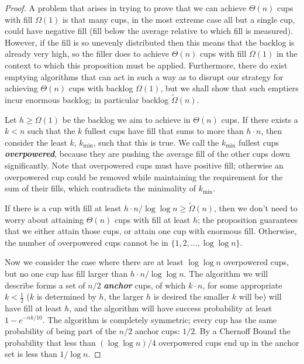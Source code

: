 \documentclass{article}[11pt]
\newcommand{\defn}[1]{{\textit{\textbf{\boldmath #1}}}}
\begin{document}
\begin{proof}
  A problem that arises in trying to prove that we can achieve $\Theta(n)$ cups
  with fill $\Omega(1)$ is that many cups, in the most extreme case all but a
  single cup, could have negative fill (fill below the average relative to
  which fill is measured). However, if the fill is so unevenly distributed then
  this means that the backlog is already very high, so the filler does to
  achieve $\Theta(n)$ cups with fill $\Omega(1)$ in the context to which this
  proposition must be applied. Furthermore, there do exist emptying algorithms
  that can act in such a way as to disrupt our strategy for achieving
  $\Theta(n)$ cups with backlog $\Omega(1)$, but we shall show that such emptiers 
  incur enormous backlog; in particular backlog $\tilde{\Omega}(n)$.

  Let $h \ge \Omega(1)$ be the backlog we aim to achieve in $\Theta(n)$ cups.
  If there exists a $k<n$ such that the $k$ fullest cups have fill
  that sums to more than $h\cdot n$, then consider the least $k$, $k_{\min}$,
  such that this is true. We call the $k_{\min}$ fullest cups
  \defn{overpowered}, because they are pushing the average fill of the other
  cups down significantly. Note that overpowered cups must have
  positive fill; otherwise an overpowered cup could be removed while
  maintaining the requirement for the sum of their fills, which contradicts the
  minimality of $k_{\min}$.

  If there is a cup with fill at least $h\cdot n / \log\log n \ge
  \tilde{\Omega}(n)$, then we don't need to worry about attaining $\Theta(n)$
  cups with fill at least $h$; the proposition guarantees that we either attain
  those cups, or attain one cup with enormous fill.
  Otherwise, the number of overpowered cups cannot be in $\{1, 2, \ldots, \log \log n\}$.

  Now we consider the case where there are at least $\log\log n$ overpowered
  cups, but no one cup has fill larger than $h\cdot n / \log\log n$.
  The algorithm we will describe forms a set of $n/2$ \defn{anchor} cups, of which $k\cdot
  n$, for some appropriate $k <\frac{1}{2}$ ($k$ is determined by $h$, the
  larger $h$ is desired the smaller $k$ will be) will have fill at least $h$,
  and the algorithm will have success probability at least $1-e^{-nk/10}$.
  The algorithm is completely symmetric; every cup has the same probability of
  being part of the $n/2$ anchor cups: $1/2$. By a Chernoff Bound the
  probability that less than $(\log\log n)/4$ overpowered cups end up in the anchor set
  is less than $1/\log n$.


\end{proof}
\end{document}
